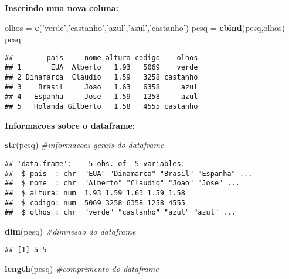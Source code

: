 \documentclass[]{article}
\newenvironment{Shaded}{\begin{snugshade}}{\end{snugshade}}
\newcommand{\KeywordTok}[1]{\textcolor[rgb]{0.13,0.29,0.53}{\textbf{#1}}}
\newcommand{\StringTok}[1]{\textcolor[rgb]{0.31,0.60,0.02}{#1}}
\newcommand{\CommentTok}[1]{\textcolor[rgb]{0.56,0.35,0.01}{\textit{#1}}}
\newcommand{\NormalTok}[1]{#1}
\begin{document}
\textbf{Inserindo uma nova coluna:}

\begin{Shaded}
\begin{Highlighting}[]
\NormalTok{olhos =}\StringTok{ }\KeywordTok{c}\NormalTok{(}\StringTok{'verde'}\NormalTok{,}\StringTok{'castanho'}\NormalTok{,}\StringTok{'azul'}\NormalTok{,}\StringTok{'azul'}\NormalTok{,}\StringTok{'castanho'}\NormalTok{)}
\NormalTok{pesq =}\StringTok{ }\KeywordTok{cbind}\NormalTok{(pesq,olhos)}
\NormalTok{pesq}
\end{Highlighting}
\end{Shaded}

\begin{verbatim}
##        pais     nome altura codigo    olhos
## 1       EUA  Alberto   1.93   5069    verde
## 2 Dinamarca  Claudio   1.59   3258 castanho
## 3    Brasil     Joao   1.63   6358     azul
## 4   Espanha     Jose   1.59   1258     azul
## 5   Holanda Gilberto   1.58   4555 castanho
\end{verbatim}

\textbf{Informacoes sobre o dataframe:}

\begin{Shaded}
\begin{Highlighting}[]
\KeywordTok{str}\NormalTok{(pesq) }\CommentTok{#informacoes gerais do dataframe}
\end{Highlighting}
\end{Shaded}

\begin{verbatim}
## 'data.frame':    5 obs. of  5 variables:
##  $ pais  : chr  "EUA" "Dinamarca" "Brasil" "Espanha" ...
##  $ nome  : chr  "Alberto" "Claudio" "Joao" "Jose" ...
##  $ altura: num  1.93 1.59 1.63 1.59 1.58
##  $ codigo: num  5069 3258 6358 1258 4555
##  $ olhos : chr  "verde" "castanho" "azul" "azul" ...
\end{verbatim}

\begin{Shaded}
\begin{Highlighting}[]
\KeywordTok{dim}\NormalTok{(pesq) }\CommentTok{#dimnesao do dataframe}
\end{Highlighting}
\end{Shaded}

\begin{verbatim}
## [1] 5 5
\end{verbatim}

\begin{Shaded}
\begin{Highlighting}[]
\KeywordTok{length}\NormalTok{(pesq) }\CommentTok{#comprimento do dataframe}
\end{Highlighting}
\end{Shaded}
\end{document}
